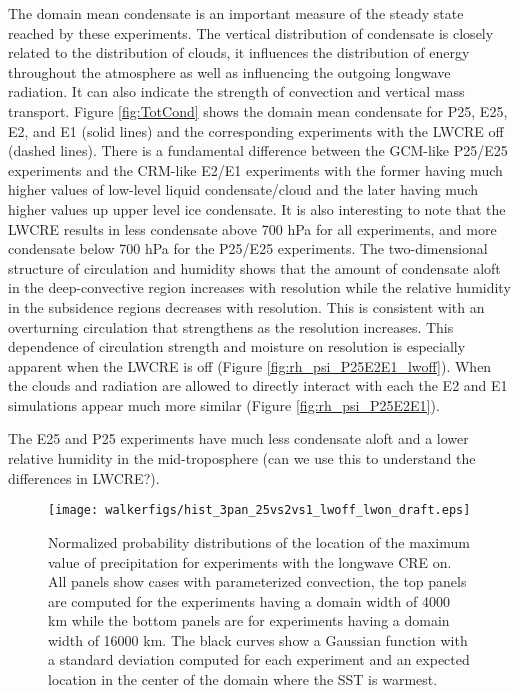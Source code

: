 \documentclass[11pt]{article}   	%
\begin{document}
The domain mean condensate is an important measure of the steady state reached by these experiments.  The vertical 
distribution of condensate is closely related to the distribution of clouds, it influences the distribution of energy throughout
the atmosphere as well as influencing the outgoing longwave radiation.  It can also indicate the strength of convection 
and vertical mass transport.     Figure \ref{fig:TotCond} shows the domain mean condensate for P25, E25, E2, and E1
(solid lines) and the corresponding experiments with the LWCRE off (dashed lines).  There is a fundamental difference 
between the GCM-like P25/E25 experiments and the CRM-like E2/E1 experiments with the former having much 
higher values of low-level liquid condensate/cloud and the later having much higher values up upper level ice condensate.  
It is also interesting to note that the LWCRE results in less condensate above 700 hPa for all experiments, and 
more condensate below 700 hPa for the P25/E25 experiments.  The two-dimensional structure of circulation and humidity
shows that the amount of condensate aloft in the deep-convective region increases with resolution while the relative
humidity in the subsidence regions decreases with resolution.  This is consistent with an overturning circulation that 
strengthens as the resolution increases.   This dependence of circulation strength and moisture on resolution is especially 
apparent when the LWCRE is off (Figure \ref{fig:rh_psi_P25E2E1_lwoff}).  When the clouds and radiation are allowed 
to directly interact with each the E2 and E1 simulations appear much more similar (Figure \ref{fig:rh_psi_P25E2E1}).   

The E25 and P25 experiments have much less condensate aloft and a lower relative humidity in the mid-troposphere 
(can we use this to understand the differences in LWCRE?).  

\begin{figure}
  \centering
       \texttt{[image: walkerfigs/hist\_3pan\_25vs2vs1\_lwoff\_lwon\_draft.eps]}
  \caption{Normalized probability distributions of the location of the maximum value of precipitation for experiments with the 
  longwave CRE on.  All panels show cases with parameterized convection, the top panels are computed for the experiments 
  having a domain width of 4000 km while the bottom panels are for experiments having a domain width of 16000 km.  The 
  black curves show a Gaussian function with a standard deviation computed for each experiment and an expected location 
  in the center of the domain where the SST is warmest. }
\end{figure}
\end{document}
